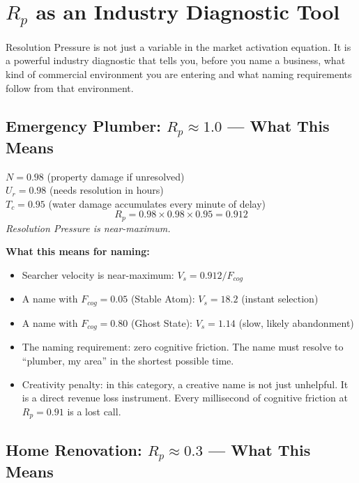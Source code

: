 \documentclass[12pt, openany]{book}
\theoremstyle{thmstyle}
\theoremstyle{defstyle}
\begin{document}
\section{$R_p$ as an Industry Diagnostic Tool}

Resolution Pressure is not just a variable in the market activation equation. It is a powerful industry diagnostic that tells you, before you name a business, what kind of commercial environment you are entering and what naming requirements follow from that environment.

\subsection{Emergency Plumber: $R_p \approx 1.0$ --- What This Means}

\begin{calcbox}
$N = 0.98$ (property damage if unresolved)\\
$U_r = 0.98$ (needs resolution in hours)\\
$T_c = 0.95$ (water damage accumulates every minute of delay)
\[
R_p = 0.98 \times 0.98 \times 0.95 = \mathbf{0.912}
\]
\textit{Resolution Pressure is near-maximum.}

\textbf{What this means for naming:}
\begin{itemize}[leftmargin=1.5em]
  \item Searcher velocity is near-maximum: $V_s = 0.912 / F_{cog}$
  \item A name with $F_{cog} = 0.05$ (Stable Atom): $V_s = 18.2$ (instant selection)
  \item A name with $F_{cog} = 0.80$ (Ghost State): $V_s = 1.14$ (slow, likely abandonment)
  \item The naming requirement: zero cognitive friction. The name must resolve to ``plumber, my area'' in the shortest possible time.
  \item Creativity penalty: in this category, a creative name is not just unhelpful. It is a direct revenue loss instrument. Every millisecond of cognitive friction at $R_p = 0.91$ is a lost call.
\end{itemize}
\end{calcbox}

\subsection{Home Renovation: $R_p \approx 0.3$ --- What This Means}
\end{document}
